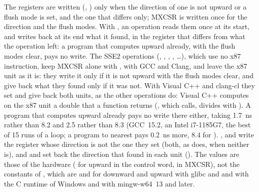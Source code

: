 \medskip
The registers are written (, ) only when the
direction of one is not upward or a flush mode is set, and the one that
differs only; MXCSR is written once for the direction and the flush modes.
With , an operation reads them once at its
start, and writes back at its end what it found, in the register that differs
from what the operation left: a program that computes upward already, with
the flush modes clear, pays no write. The SSE2 operations (\code{+},
\code{-}, \code{*}, \code{/}, \ldots), which use no x87
instruction, keep MXCSR alone with , with GCC and Clang,
and leave the x87 unit as it is: they write it only if it is not upward with the flush
modes clear, and give back what they found only if it was
not. With Visual C++ and clang-cl they set and give back both units, as the
other operations do: Visual C++ computes on the x87 unit a double that a
function returns (, which  calls,
divides with ).\newinvfive{} A program that computes upward already pays no write there
either,  taking 1.7~ns rather than 8.2 and  2.5
rather than 8.3 (GCC~15.2, an Intel i7-1185G7, the best of 15 runs of a
loop; a program to nearest pays 0.2~ns more, 8.4 for ).
,  and 
write the register whose direction is not the one they set (both, as
 does, when neither is), and  and
 set back the direction that  found in
each unit (). The values are those of the hardware
( for upward in the control word,  in MXCSR), not
the  constants of , which are  and
 for downward and upward with glibc and  and
 with the C runtime of Windows and with mingw-w64~13 and later.

